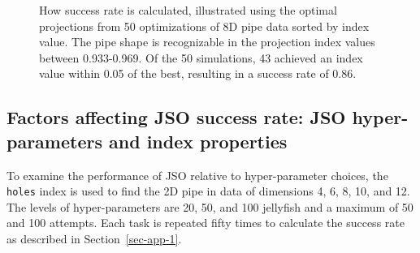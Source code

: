 \documentclass[
  12pt,
]{interact}
\theoremstyle{plain}
\begin{document}
\begin{figure}


\caption{\label{fig-success-rate}How success rate is calculated,
illustrated using the optimal projections from 50 optimizations of 8D
pipe data sorted by index value. The pipe shape is recognizable in the
projection index values between 0.933-0.969. Of the 50 simulations, 43
achieved an index value within 0.05 of the best, resulting in a success
rate of 0.86.}

\end{figure}%

\subsection{Factors affecting JSO success rate: JSO hyper-parameters and
index properties}\label{sec-app-2}

To examine the performance of JSO relative to hyper-parameter choices,
the \texttt{holes} index is used to find the 2D pipe in data of
dimensions 4, 6, 8, 10, and 12. The levels of hyper-parameters are 20,
50, and 100 jellyfish and a maximum of 50 and 100 attempts. Each task is
repeated fifty times to calculate the success rate as described in
Section~\ref{sec-app-1}.
\end{document}
